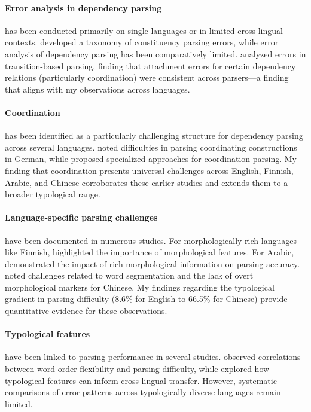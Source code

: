 \documentclass[11pt]{article}
\begin{document}
\paragraph{Error analysis in dependency parsing} has been conducted primarily on single languages or in limited cross-lingual contexts. \citet{kummerfeld-etal-2012-parser} developed a taxonomy of constituency parsing errors, while error analysis of dependency parsing has been comparatively limited. \citet{alonso-zeman-2016-dependency} analyzed errors in transition-based parsing, finding that attachment errors for certain dependency relations (particularly coordination) were consistent across parsers—a finding that aligns with my observations across languages.

\paragraph{Coordination} has been identified as a particularly challenging structure for dependency parsing across several languages. \citet{maier-etal-2012-annotating} noted difficulties in parsing coordinating constructions in German, while \citet{ficler-goldberg-2016-coordination} proposed specialized approaches for coordination parsing. My finding that coordination presents universal challenges across English, Finnish, Arabic, and Chinese corroborates these earlier studies and extends them to a broader typological range.

\paragraph{Language-specific parsing challenges} have been documented in numerous studies. For morphologically rich languages like Finnish, \citet{eryigit-etal-2008-dependency} highlighted the importance of morphological features. For Arabic, \citet{marton-etal-2013-dependency} demonstrated the impact of rich morphological information on parsing accuracy. \citet{zhang-etal-2016-creating} noted challenges related to word segmentation and the lack of overt morphological markers for Chinese. My findings regarding the typological gradient in parsing difficulty (8.6\% for English to 66.5\% for Chinese) provide quantitative evidence for these observations.

\paragraph{Typological features} have been linked to parsing performance in several studies. \citet{nivre-2015-towards} observed correlations between word order flexibility and parsing difficulty, while \citet{tackstrom-etal-2013-target} explored how typological features can inform cross-lingual transfer. However, systematic comparisons of error patterns across typologically diverse languages remain limited.
\end{document}
